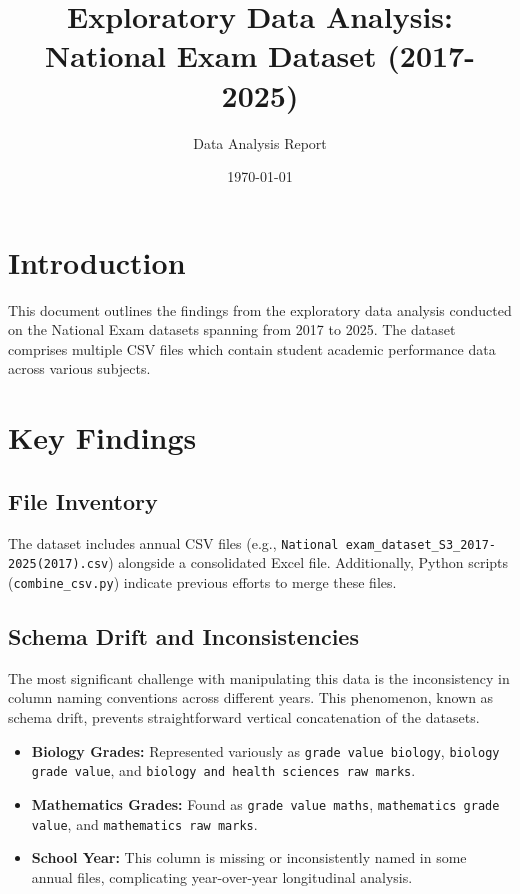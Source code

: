 \documentclass{article}
\title{Exploratory Data Analysis: National Exam Dataset (2017-2025)}
\author{Data Analysis Report}
\date{\today}
\begin{document}
\maketitle

\section{Introduction}
This document outlines the findings from the exploratory data analysis conducted on the National Exam datasets spanning from 2017 to 2025. The dataset comprises multiple CSV files which contain student academic performance data across various subjects.

\section{Key Findings}
\subsection{File Inventory}
The dataset includes annual CSV files (e.g., \texttt{National exam\_dataset\_S3\_2017-2025(2017).csv}) alongside a consolidated Excel file. Additionally, Python scripts (\texttt{combine\_csv.py}) indicate previous efforts to merge these files.

\subsection{Schema Drift and Inconsistencies}
The most significant challenge with manipulating this data is the inconsistency in column naming conventions across different years. This phenomenon, known as schema drift, prevents straightforward vertical concatenation of the datasets.
\begin{itemize}
    \item \textbf{Biology Grades:} Represented variously as \texttt{grade value biology}, \texttt{biology grade value}, and \texttt{biology and health sciences raw marks}.
    \item \textbf{Mathematics Grades:} Found as \texttt{grade value maths}, \texttt{mathematics grade value}, and \texttt{mathematics raw marks}.
    \item \textbf{School Year:} This column is missing or inconsistently named in some annual files, complicating year-over-year longitudinal analysis.
\end{itemize}
\end{document}
